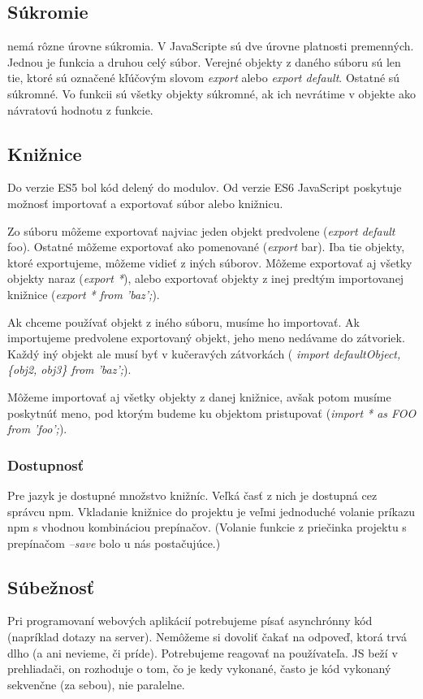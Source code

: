 \subsection{Súkromie}
\JS{} nemá rôzne úrovne súkromia. V JavaScripte sú dve úrovne platnosti premenných. Jednou je funkcia a druhou celý súbor. Verejné objekty z daného súboru sú len tie, ktoré sú označené kľúčovým slovom \emph{export} alebo \emph{export default}. Ostatné sú súkromné. Vo funkcii sú všetky objekty súkromné, ak ich nevrátime v objekte ako návratovú hodnotu z funkcie.

\subsection{Knižnice}
Do verzie ES5 bol kód delený do modulov. Od verzie ES6 JavaScript poskytuje možnosť importovať a exportovať súbor alebo knižnicu.

Zo súboru môžeme exportovať najviac jeden objekt predvolene (\emph{export default} foo). Ostatné môžeme exportovať ako pomenované (\emph{export} bar). 
Iba tie objekty, ktoré exportujeme, môžeme vidieť z iných súborov. 
Môžeme exportovať aj všetky objekty naraz (\emph{export *}), alebo exportovať objekty z inej predtým importovanej knižnice (\emph{export * from 'baz';}).

Ak chceme používať objekt z iného súboru, musíme ho importovať. Ak importujeme predvolene exportovaný objekt, jeho meno nedávame do zátvoriek. 
Každý iný objekt ale musí byť v kučeravých zátvorkách (
\emph{import defaultObject, \{obj2, obj3\} from 'baz';}).

Môžeme importovať aj všetky objekty z danej knižnice, avšak potom musíme poskytnúť meno, pod ktorým budeme ku objektom pristupovať (\emph{import * as FOO from 'foo';}).

\subsubsection{Dostupnosť}
Pre jazyk \JS{} je dostupné množstvo knižníc. Veľká časť z nich je dostupná cez správcu npm. Vkladanie knižnice do projektu je veľmi jednoduché volanie príkazu npm s vhodnou kombináciou prepínačov. (Volanie funkcie z priečinka projektu s prepínačom \emph{--save} bolo u nás postačujúce.)

\subsection{Súbežnosť}
Pri programovaní webových aplikácií potrebujeme písať asynchrónny kód (napríklad dotazy na server). Nemôžeme si dovoliť čakať na odpoveď, ktorá trvá dlho (a ani nevieme, či príde). Potrebujeme reagovať na používateľa.
JS beží v prehliadači, on rozhoduje o tom, čo je kedy vykonané, často je kód vykonaný sekvenčne (za sebou), nie paralelne.

